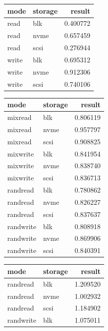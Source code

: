 \documentclass[twocolumn]{article}
\begin{document}
\begin{table}
    \label{tab:experimentasdasdas-environment}
    \begin{tabular}{llr}
        \hline
        \textbf{mode}& \textbf{storage} & \textbf{result} \\
        \hline
         read & blk & 0.400772 \\
         read & nvme & 0.657459 \\
        read & scsi & 0.276944 \\
        write & blk & 0.695312 \\
        write & nvme & 0.912306 \\
        write & scsi & 0.740106 \\ 
        \hline
    \end{tabular}
    \hfill
    \label{tab:sadasdasdasdasd-environment}
    \begin{tabular}{llr}
        \hline
        \textbf{mode}& \textbf{storage} & \textbf{result} \\
        \hline
        mixread & blk & 0.806119 \\
        mixread & nvme & 0.957797 \\
        mixread & scsi & 0.908825 \\
        mixwrite & blk & 0.841954 \\
        mixwrite & nvme & 0.838740 \\
        mixwrite & scsi & 0.836713 \\
        randread & blk & 0.780862 \\
        randread & nvme & 0.826227 \\
         randread & scsi & 0.837637 \\
        randwrite & blk & 0.808918 \\
         randwrite & nvme & 0.869906 \\
        randwrite & scsi & 0.840391 \\
        \hline
    \end{tabular}
    \hfill
    \label{tab:experimasdasdasdadsent-environment}
    \begin{tabular}{llr}
        \hline
        \textbf{mode}& \textbf{storage} & \textbf{result} \\
        \hline
        randread & blk & 1.209520 \\
        randread & nvme & 1.002932 \\
        randread & scsi & 1.184902 \\
        randwrite & blk & 1.075011 \\

\end{tabular}
\end{table}
\end{document}
